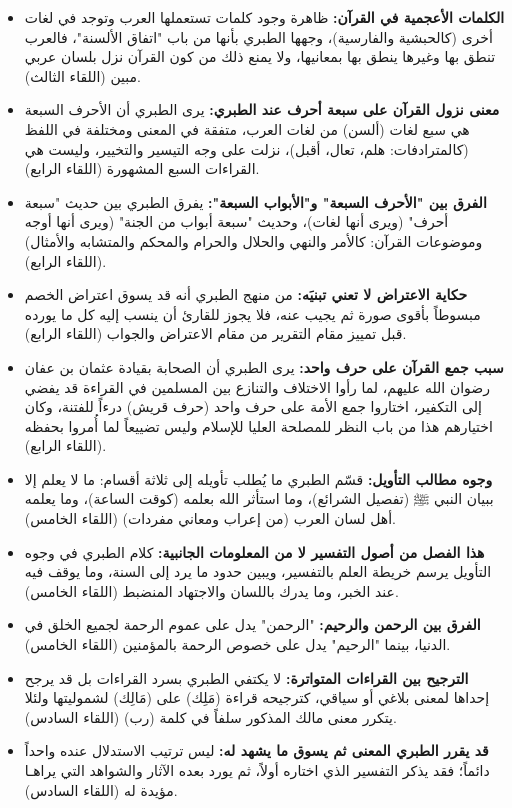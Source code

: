 \begin{itemize}
    \item \textbf{الكلمات الأعجمية في القرآن:} ظاهرة وجود كلمات تستعملها العرب وتوجد في لغات أخرى (كالحبشية والفارسية)، وجهها الطبري بأنها من باب "اتفاق الألسنة"، فالعرب تنطق بها وغيرها ينطق بها بمعانيها، ولا يمنع ذلك من كون القرآن نزل بلسان عربي مبين (اللقاء الثالث).
    \item \textbf{معنى نزول القرآن على سبعة أحرف عند الطبري:} يرى الطبري أن الأحرف السبعة هي سبع لغات (ألسن) من لغات العرب، متفقة في المعنى ومختلفة في اللفظ (كالمترادفات: هلم، تعال، أقبل)، نزلت على وجه التيسير والتخيير، وليست هي القراءات السبع المشهورة (اللقاء الرابع).
    \item \textbf{الفرق بين "الأحرف السبعة" و"الأبواب السبعة":} يفرق الطبري بين حديث "سبعة أحرف" (ويرى أنها لغات)، وحديث "سبعة أبواب من الجنة" (ويرى أنها أوجه وموضوعات القرآن: كالأمر والنهي والحلال والحرام والمحكم والمتشابه والأمثال) (اللقاء الرابع).
    \item \textbf{حكاية الاعتراض لا تعني تبنيَه:} من منهج الطبري أنه قد يسوق اعتراض الخصم مبسوطاً بأقوى صورة ثم يجيب عنه، فلا يجوز للقارئ أن ينسب إليه كل ما يورده قبل تمييز مقام التقرير من مقام الاعتراض والجواب (اللقاء الرابع).
    \item \textbf{سبب جمع القرآن على حرف واحد:} يرى الطبري أن الصحابة بقيادة عثمان بن عفان رضوان الله عليهم، لما رأوا الاختلاف والتنازع بين المسلمين في القراءة قد يفضي إلى التكفير، اختاروا جمع الأمة على حرف واحد (حرف قريش) درءاً للفتنة، وكان اختيارهم هذا من باب النظر للمصلحة العليا للإسلام وليس تضييعاً لما أُمروا بحفظه (اللقاء الرابع).
    \item \textbf{وجوه مطالب التأويل:} قسّم الطبري ما يُطلب تأويله إلى ثلاثة أقسام: ما لا يعلم إلا ببيان النبي ﷺ (تفصيل الشرائع)، وما استأثر الله بعلمه (كوقت الساعة)، وما يعلمه أهل لسان العرب (من إعراب ومعاني مفردات) (اللقاء الخامس).
    \item \textbf{هذا الفصل من أصول التفسير لا من المعلومات الجانبية:} كلام الطبري في وجوه التأويل يرسم خريطة العلم بالتفسير، ويبين حدود ما يرد إلى السنة، وما يوقف فيه عند الخبر، وما يدرك باللسان والاجتهاد المنضبط (اللقاء الخامس).
    \item \textbf{الفرق بين الرحمن والرحيم:} "الرحمن" يدل على عموم الرحمة لجميع الخلق في الدنيا، بينما "الرحيم" يدل على خصوص الرحمة بالمؤمنين (اللقاء الخامس).
    \item \textbf{الترجيح بين القراءات المتواترة:} لا يكتفي الطبري بسرد القراءات بل قد يرجح إحداها لمعنى بلاغي أو سياقي، كترجيحه قراءة (مَلِك) على (مَالِك) لشموليتها ولئلا يتكرر معنى مالك المذكور سلفاً في كلمة (رب) (اللقاء السادس).
    \item \textbf{قد يقرر الطبري المعنى ثم يسوق ما يشهد له:} ليس ترتيب الاستدلال عنده واحداً دائماً؛ فقد يذكر التفسير الذي اختاره أولاً، ثم يورد بعده الآثار والشواهد التي يراهـا مؤيدة له (اللقاء السادس).

\end{itemize}
